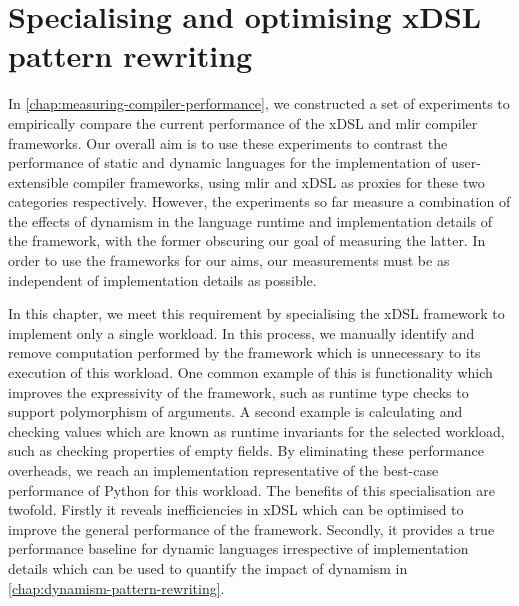\chapter{Specialising and optimising xDSL pattern rewriting}
\label{chap:specialising-optimising-pattern-rewriting}

In \autoref{chap:measuring-compiler-performance}, we constructed a set of experiments to empirically compare the current performance of the xDSL and \ac{mlir} compiler frameworks.
Our overall aim is to use these experiments to contrast the performance of static and dynamic languages for the implementation of user-extensible compiler frameworks, using \ac{mlir} and xDSL as proxies for these two categories respectively.
However, the experiments so far measure a combination of the effects of dynamism in the language runtime and implementation details of the framework, with the former obscuring our goal of measuring the latter.
In order to use the frameworks for our aims, our measurements must be as independent of implementation details as possible.

In this chapter, we meet this requirement by specialising the xDSL framework to implement only a single workload.
In this process, we manually identify and remove computation performed by the framework which is unnecessary to its execution of this workload. One common example of this is functionality which improves the expressivity of the framework, such as runtime type checks to support polymorphism of arguments. A second example is calculating and checking values which are known as runtime invariants for the selected workload, such as checking properties of empty fields.
By eliminating these performance overheads, we reach an implementation representative of the best-case performance of Python for this workload.
The benefits of this specialisation are twofold. Firstly it reveals inefficiencies in xDSL which can be optimised to improve the general performance of the framework. Secondly, it provides a true performance baseline for dynamic languages irrespective of implementation details which can be used to quantify the impact of dynamism in \autoref{chap:dynamism-pattern-rewriting}.


